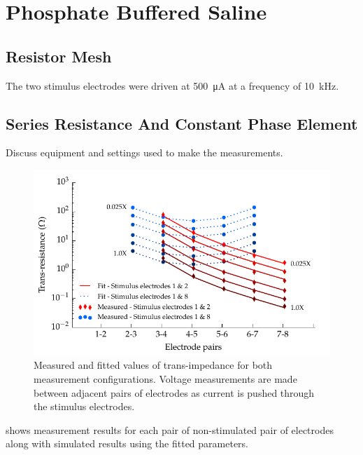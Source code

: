 
\section{Phosphate Buffered Saline}
    \subsection{Resistor Mesh}
        The two stimulus electrodes were driven at \SI{500}{\micro\ampere} at a frequency of \SI{10}{\kilo\hertz}.

    \subsection{Series Resistance And Constant Phase Element}
        Discuss equipment and settings used to make the measurements.

        \begin{figure}
          \centering
          \includegraphics{content/pt2/07-InterfaceModel/graphics/graph_transimpedance_pbs}
          \caption{\label{fig:pt2-graph_transimpedance_pbs}Measured and fitted values of trans-impedance for both measurement configurations. Voltage measurements are made between adjacent pairs of electrodes as current is pushed through the stimulus electrodes.}
        \end{figure}

         shows measurement results for each pair of non-stimulated pair of electrodes along with simulated results using the fitted parameters.


